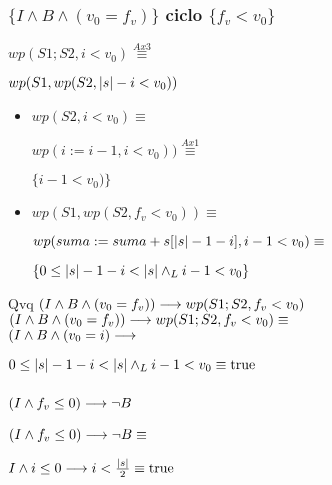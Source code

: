 \documentclass{article}
\begin{document}
\subsubsection*{$\{I \wedge B \wedge (v_{0} = f_{v})\}$ ciclo $\{f_{v} < v_{0}\}$}

$wp(S1;S2, i<v_{0}) \stackrel{Ax3}{\equiv}$

$wp(S1, wp(S2, |s|-i<v_{0}))$

\begin{itemize}
    \item $wp(S2, i<v_{0}) \equiv$
    
    $ wp(i:= i-1, i<v_{0})) \stackrel{Ax1}{\equiv}$

    $\{i-1<v_{0}) \}$

    \item $wp(S1, wp(S2, f_{v} < v_{0})) \equiv$

    $wp(suma := suma + s[|s|-1-i], i-1<v_{0}) \equiv$

    $\{ 0 \leq |s|-1-i < |s| \land _L i-1<v_{0} \} $

\end{itemize}

Qvq $(I \wedge B \wedge (v_{0} = f_{v})) \longrightarrow wp(S1;S2, f_{v} < v_{0})$ \\

$ (I \wedge B \wedge (v_{0} = f_{v})) \longrightarrow wp(S1;S2, f_{v} < v_{0}) \equiv$ \\

$ (I \wedge B \wedge (v_{0} = i)\longrightarrow$

$ 0 \leq |s|-1-i < |s| \land _L i-1<v_{0} \equiv \mathrm{true}$

\subsubsection*{$(I \wedge f_{v} \leq 0) \longrightarrow \neg B$}

$(I \wedge f_{v} \leq 0) \longrightarrow \neg B \equiv $

$I \wedge i \leq 0 \longrightarrow i < \frac{|s|}{2} \equiv \mathrm{true}$
\end{document}
